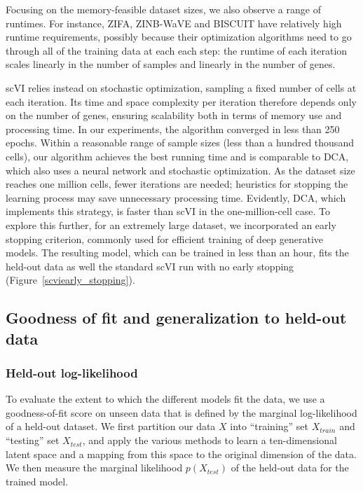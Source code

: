 Focusing on the memory-feasible dataset sizes, we also observe a range of runtimes. For instance, ZIFA,  ZINB-WaVE and BISCUIT have relatively high runtime requirements, possibly because their optimization algorithms need to go through all of the training data at each each step: the runtime of each iteration scales linearly in the number of samples and linearly in the number of genes.

scVI relies instead on stochastic optimization, sampling a fixed number of cells at each iteration. Its time and space complexity per iteration therefore depends only on the number of genes, ensuring scalability both in terms of memory use and processing time. In our experiments, the algorithm converged in less than 250 epochs. Within a reasonable range of sample sizes (less than a hundred thousand cells), our algorithm achieves the best running time and is comparable to DCA, which also uses a neural network and stochastic optimization. As the dataset size reaches one million cells, fewer iterations are needed; heuristics for stopping the learning process may save unnecessary processing time. Evidently, DCA, which implements this strategy, is faster than scVI in the one-million-cell case. To explore this further, for an extremely large dataset, we incorporated an early stopping criterion, commonly used for efficient training of deep generative models. The resulting model, which can be trained in less than an hour, fits the held-out data as well the standard scVI run with no early stopping (Figure~\ref{scviearly_stopping}). 


\subsection{Goodness of fit and generalization to held-out data}

\subsubsection{Held-out log-likelihood}
To evaluate the extent to which the different models fit the data, we use a goodness-of-fit score on unseen data that is defined by the marginal log-likelihood of a held-out dataset. We first partition our data $X$ into ``training'' set $X_{train}$ and ``testing'' set $X_{test}$, and apply the various methods to learn a ten-dimensional latent space and a mapping from this space to the original dimension of the data. We then measure the marginal likelihood $p(X_{test})$ of the held-out data for the trained model. 

